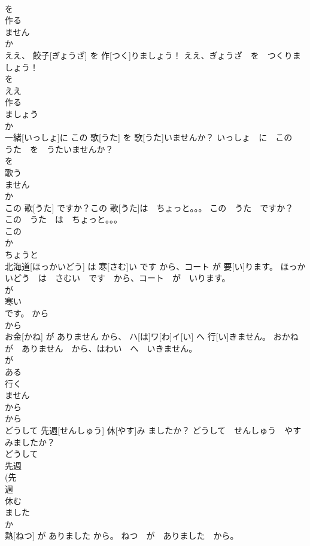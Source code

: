 \documentclass[8pt]{extreport}
\begin{document}
\begin{CJK}{UTF8}{min}
\\	を 
\\	作る 
\\	ません 
\\	か 
\\	ええ、 餃子[ぎょうざ] を 作[つく]りましょう！	ええ、ぎょうざ　を　つくりましょう！	
\\	を 
\\	ええ 
\\	作る 
\\	ましょう 
\\	か 
\\	一緒[いっしょ]に この 歌[うた] を 歌[うた]いませんか？	いっしょ　に　この　うた　を　うたいませんか？	
\\	を 
\\	歌う 
\\	ません 
\\	か 
\\	この 歌[うた] ですか？この 歌[うた]は　ちょっと。。。	この　うた　ですか？　この　うた　は　ちょっと。。。	
\\	この 
\\	か 
\\	ちょうと 
\\	北海道[ほっかいどう] は 寒[さむ]い です から、コート が 要[い]ります。	ほっかいどう　は　さむい　です　から、コート　が　いります。	
\\	が 
\\	寒い 
\\	です。	から 
\\	から 
\\	お金[かね] が ありません から、 ハ[は]ワ[わ]イ[い] へ 行[い]きません。	おかね　が　ありません　から、はわい　へ　いきません。	
\\	が 
\\	ある 
\\	行く 
\\	ません 
\\	から 
\\	から 
\\	どうして 先週[せんしゅう] 休[やす]み ましたか？	どうして　せんしゅう　やすみましたか？	
\\	どうして 
\\	先週 
\\	(先 
\\	週 
\\	休む 
\\	ました 
\\	か 
\\	熱[ねつ] が ありました から。	ねつ　が　ありました　から。	

\end{CJK}
\end{document}
